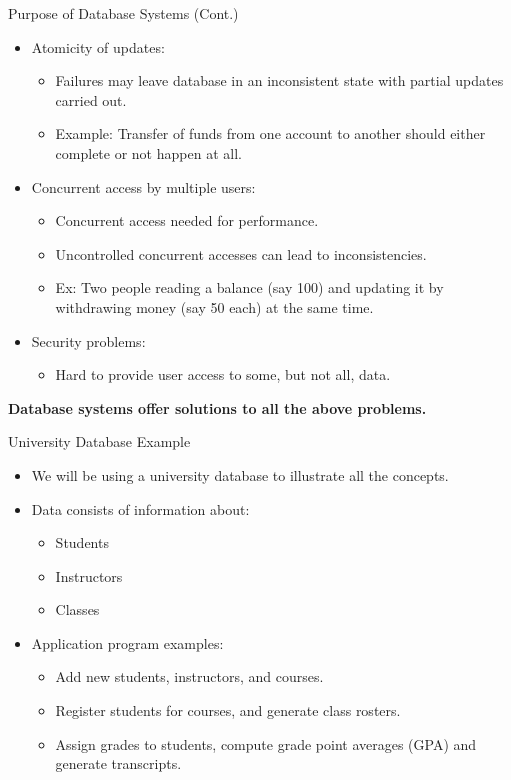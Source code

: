 \documentclass[aspectratio=169]{beamer}
\begin{document}
\begin{frame}{Purpose of Database Systems (Cont.)}
    \begin{itemize}
        \pause
        \item Atomicity of updates:
        \begin{itemize}
            \item Failures may leave database in an inconsistent state with partial updates carried out.
            \item Example: Transfer of funds from one account to another should either complete or not happen at all.
        \end{itemize}
        \pause
        \item Concurrent access by multiple users:
        \begin{itemize}
            \item Concurrent access needed for performance.
            \item Uncontrolled concurrent accesses can lead to inconsistencies.
            \item Ex: Two people reading a balance (say 100) and updating it by withdrawing money (say 50 each) at the same time.
        \end{itemize}
        \pause
        \item Security problems:
        \begin{itemize}
            \item Hard to provide user access to some, but not all, data.
        \end{itemize}
    \end{itemize}
    \pause
    \vspace{5mm}
    \centering
    \textbf{Database systems offer solutions to all the above problems.}
\end{frame}

\begin{frame}{University Database Example}
    \begin{itemize}
        \item We will be using a university database to illustrate all the concepts.
        \item Data consists of information about:
        \begin{itemize}
            \item Students
            \item Instructors
            \item Classes
        \end{itemize}
        \item Application program examples:
        \begin{itemize}
            \item Add new students, instructors, and courses.
            \item Register students for courses, and generate class rosters.
            \item Assign grades to students, compute grade point averages (GPA) and generate transcripts.
        \end{itemize}
    \end{itemize}
\end{frame}
\end{document}
